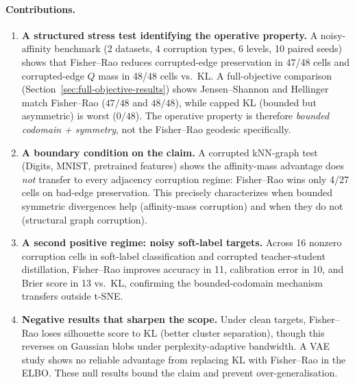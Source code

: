 \documentclass[11pt]{article}
\begin{document}
\paragraph{Contributions.}
\begin{enumerate}
  \item \textbf{A structured stress test identifying the operative property.}
        A noisy-affinity benchmark (2 datasets, 4 corruption types, 6 levels, 10 paired seeds)
        shows that Fisher--Rao reduces corrupted-edge preservation in 47/48 cells and
        corrupted-edge $Q$ mass in 48/48 cells vs.\ KL.
        A full-objective comparison (Section~\ref{sec:full-objective-results}) shows
        Jensen--Shannon and Hellinger match Fisher--Rao ($47/48$ and $48/48$), while
        capped KL (bounded but asymmetric) is worst ($0/48$).
        The operative property is therefore \emph{bounded codomain + symmetry}, not
        the Fisher--Rao geodesic specifically.

  \item \textbf{A boundary condition on the claim.}
        A corrupted kNN-graph test (Digits, MNIST, pretrained features) shows the
        affinity-mass advantage does \emph{not} transfer to every adjacency corruption
        regime: Fisher--Rao wins only 4/27 cells on bad-edge preservation.
        This precisely characterizes when bounded symmetric divergences help (affinity-mass
        corruption) and when they do not (structural graph corruption).

  \item \textbf{A second positive regime: noisy soft-label targets.}
        Across 16 nonzero corruption cells in soft-label classification and corrupted
        teacher-student distillation, Fisher--Rao improves accuracy in 11, calibration
        error in 10, and Brier score in 13 vs.\ KL, confirming the bounded-codomain
        mechanism transfers outside t-SNE.

  \item \textbf{Negative results that sharpen the scope.}
        Under clean targets, Fisher--Rao loses silhouette score to KL (better cluster
        separation), though this reverses on Gaussian blobs under perplexity-adaptive
        bandwidth.
        A VAE study shows no reliable advantage from replacing KL with Fisher--Rao in the
        ELBO.
        These null results bound the claim and prevent over-generalisation.
\end{enumerate}
\end{document}
